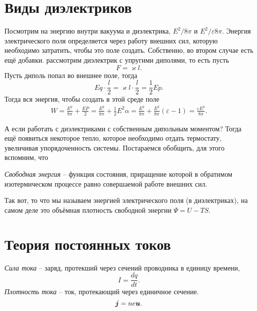\section{Виды диэлектриков}

Посмотрим на энергию внутри вакуума и диэлектрика, $E^2 / 8\pi$ и $E^2 / \varepsilon 8 \pi$. Энергия электрического поля определяется через работу внешних сил, которую необходимо затратить, чтобы это поле создать. Собственно, во втором случае есть ещё добавки. рассмотрим диэлектрик с упругими диполями, то есть пусть
$$
    F = \varkappa l.
$$
Пусть диполь попал во внешнее поле, тогда
$$
    Eq \cdot \frac{l}{2} = \varkappa l \cdot \frac{l}{2} = \frac{1}{2} E p.
$$
Тогда вся энергия, чтобы создать в этой среде поле
\begin{align*}
    W = \frac{E^2}{8\pi} + \frac{E P}{2} = \frac{E^2}{8\pi} + \frac{1}{2} E^2 \alpha 
    =  \frac{E^2}{8\pi} +  \frac{E^2}{8\pi} (\varepsilon - 1) = \frac{\varepsilon E^2}{8 \pi} .
\end{align*}

А если работать с диэлектриками с собственным дипольным моментом? Тогда ещё появиться некоторое тепло, которое необходимо отдать термостату, увеличивая упорядоченность системы. Постараемся обобщить, для этого вспомним, что

\begin{to_def} 
     \textit{Свободная энергия} -- функция состояния, приращение которой в обратимом изотермическом процессе равно совершаемой работе внешних сил.
\end{to_def}

Так вот, то что мы называем энергией электрического поля (в диэлектриках), на самом деле это объёмная плотность свободной энергии $\Psi = U - TS$.


\section{Теория постоянных токов}

\begin{to_def} 
    \textit{Сила тока} -- заряд, протекший через сечений проводника в единицу времени, 
    \begin{equation}
        I = \frac{dq}{dt}.
    \end{equation}
    \textit{Плотность тока} -- ток, протекающий через единичное сечение.
    \begin{equation}
        \mbox{\boldmath $j$} = n e \mbox{\boldmath $u$}.
    \end{equation}
\end{to_def}



